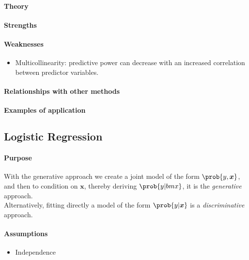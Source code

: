 \paragraph{Theory}
\paragraph{Strengths}
\paragraph{Weaknesses}
\begin{itemize}
    \item Multicollinearity: predictive power can decrease with an 
        increased correlation between predictor variables.
\end{itemize}

\paragraph{Relationships with other methods}
\paragraph{Examples of application}


\subsection{Logistic Regression}
\paragraph{Purpose}
With the generative approach we create a joint model of the form $\prob{y,\bm{x}}$, and
then to condition on $\bm{x}$, thereby deriving $\prob{y|bm{x}}$, it is the \emph{
generative} approach.\\
Alternatively, fitting directly a model of the form $\prob{y|\bm{x}}$ is a \emph{
discriminative} approach.
\paragraph{Assumptions}
\begin{itemize}
    \item Independence
\end{itemize}

